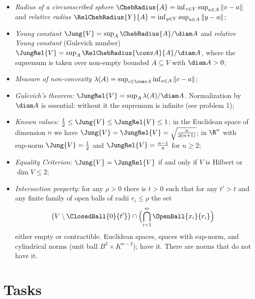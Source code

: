 \documentclass[a4paper,12pt]{report}
\begin{document}
\begin{itemize}[leftmargin=*]
\item \emph{Radius of a circumscribed sphere} $\ChebRadius{A} = \inf_{v \in V} \sup_{a \in A} \|v - a\|$ and \emph{relative radius} $\RelChebRadius{Y}{A} = \inf_{y \in Y} \sup_{a \in A} \|y - a\|$\textup{;}
\item \emph{Young constant} $\Jung{V} = \sup_A \ChebRadius{A}/\diam A$ and \emph{relative Young constant} \textup{(}Gulevich number\textup{)} $\JungRel{V} = \sup_A \RelChebRadius{\conv A}{A}/\diam A$, where the supremum is taken over non-empty bounded $A \subseteq V$ with $\diam A > 0$\textup{;}
\item \emph{Measure of non-convexity} $\lambda(A) = \sup_{c \in \conv A} \inf_{a \in A} \|c - a\|$\textup{;}
\item \emph{Gulevich's theorem\textup{:}} $\JungRel{V} = \sup_A \lambda(A)/\diam A$. Normalization by $\diam A$ is essential\textup{:} without it the supremum is infinite \textup{(}see problem \textup{1}\textup{)}\textup{;}
\item \emph{Known values\textup{:}} $\frac12 \le \Jung{V} \le \JungRel{V} \le 1$\textup{;} in the Euclidean space of dimension $n$ we have $\Jung{V} = \JungRel{V} = \sqrt{\frac{n}{2(n+1)}}$\textup{;} in $\R^n$ with sup-norm $\Jung{V} = \frac12$ and $\JungRel{V} = \frac{n-1}{n}$ for $n \ge 2$\textup{;}
\item \emph{Equality Criterion\textup{:}} $\Jung{V} = \JungRel{V}$ if and only if $V$ is Hilbert or $\dim V \le 2$\textup{;}
\item \emph{Intersection property\textup{:}} for any $\rho > 0$ there is $t > 0$ such that for any $t' > t$ and any finite family of open balls of radii $r_i \le \rho$ the set
\[
\bigl(V \setminus \ClosedBall{0}{t'}\bigr) \cap \Bigl(\bigcap_{i=1}^m \OpenBall{x_i}{r_i}\Bigr)
\]
either empty or contractible. Euclidean spaces, spaces with sup-norm, and cylindrical norms \textup{(}unit ball $B^2 \times K^{n-2}$\textup{)}\textup{;} have it. There are norms that do not have it.
\end{itemize}
\section*{Tasks}
\end{document}
